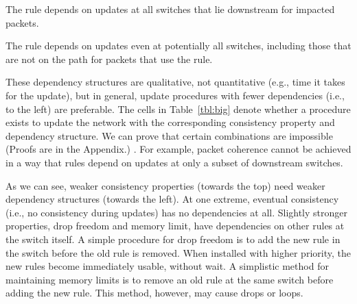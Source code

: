  The rule depends on updates at all switches that lie downstream for impacted packets.

 The rule depends on updates even at potentially all switches, including those that are not on the path for packets that use the rule.




These dependency structures are qualitative, not quantitative (e.g., time it takes for the update), but in general, update procedures with fewer dependencies (i.e., to the left) are preferable. The cells in Table~\ref{tbl:big} denote whether a procedure exists to update the network with the corresponding consistency property and dependency structure. We can prove that certain combinations are impossible
\iflongversion
(Proofs are in the Appendix.)
\else
\cite{tr}.
\fi
For example, packet coherence cannot be achieved in a way that rules depend on updates at only a subset of downstream switches.

As we can see,  weaker consistency properties (towards the top) need weaker dependency structures (towards the left). At one extreme, eventual consistency (i.e., no consistency during updates) has no dependencies at all.  Slightly stronger properties, drop freedom and memory limit, have dependencies on other rules at the switch itself. A simple procedure for drop freedom is to add the new rule in the switch before the old rule is removed. When installed with higher priority, the new rules become immediately usable, without wait.
A simplistic method for maintaining memory limits is to remove an old rule at the same switch before adding the new rule. This method, however, may cause drops or loops.

